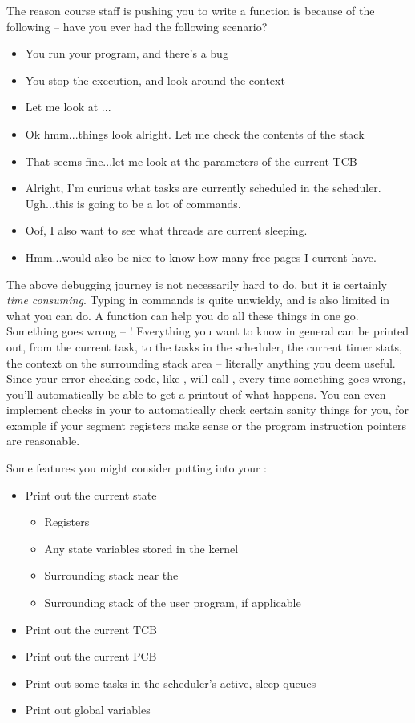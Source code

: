 \documentclass{article}
\begin{document}
The reason course staff is pushing you to write a  function is
because of the following -- have you ever had the following scenario?
\begin{itemize}
  \item You run your program, and there's a bug
  \item You stop the execution, and look around the context
  \item Let me look at ... 
  \item Ok hmm...things look alright. Let me check the contents of the stack
  \item That seems fine...let me look at the parameters of the current TCB
  \item Alright, I'm curious what tasks are currently scheduled in the
  scheduler. Ugh...this is going to be a lot of  commands.
  \item Oof, I also want to see what threads are current sleeping.
  \item Hmm...would also be nice to know how many free pages I current have.
\end{itemize}
The above debugging journey is not necessarily hard to do, but it is
certainly \textit{time consuming}. Typing in  commands is quite
unwieldy, and is also limited in what you can do. A  function can
help you do all these things in one go. Something goes wrong -- !
Everything you want to know in general can be printed out, from the current
task, to the tasks in the scheduler, the current timer stats, the context on
the surrounding stack area -- literally anything you deem useful. Since your
error-checking code, like , will call , every time
something goes wrong, you'll automatically be able to get a printout of what
happens. You can even implement checks in your  to automatically
check certain sanity things for you, for example if your segment registers
make sense or the program instruction pointers are reasonable.

Some features you might consider putting into your :
\begin{itemize}
  \item Print out the current state
  \begin{itemize}
    \item Registers
    \item Any state variables stored in the kernel
    \item Surrounding stack near the 
    \item Surrounding stack of the user program, if applicable
  \end{itemize}
  \item Print out the current TCB 
  \item Print out the current PCB
  \item Print out some tasks in the scheduler's active, sleep queues
  \item Print out global variables
\end{itemize}
\end{document}
